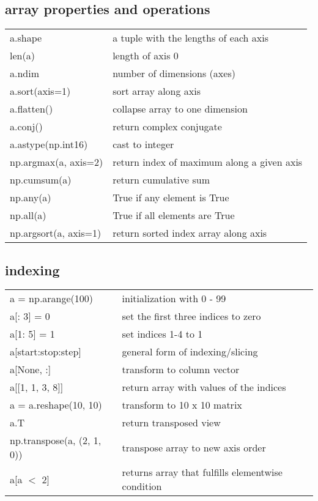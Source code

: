 \documentclass[10pt, a4paper, twocolumn]{article}
\begin{document}
\subsection*{array properties and operations}
\begin{tabular}{ p{} p{} }
  a.shape & a tuple with the lengths of each axis\\
  len(a) & length of axis 0\\
  a.ndim & number of dimensions (axes)\\
  a.sort(axis=1) & sort array along axis\\
  a.flatten() & collapse array to one dimension\\
  a.conj() & return complex conjugate\\
  a.astype(np.int16) & cast to integer\\
  np.argmax(a, axis=2) & return index of maximum along a given axis\\
  np.cumsum(a) & return cumulative sum\\
  np.any(a) & True if any element is True\\
  np.all(a) & True if all elements are True\\
  np.argsort(a, axis=1) & return sorted index array along axis\\
\end{tabular}

\subsection*{indexing}
\begin{tabular}{ p{} p{} }
  a = np.arange(100) & initialization with 0 - 99\\
  a[: 3] = 0 & set the first three indices to zero\\
  a[1: 5] = 1 & set indices 1-4 to 1\\
  a[start:stop:step] & general form of indexing/slicing\\
  a[None, :] & transform to column vector\\
  a[[1, 1, 3, 8]] & return array with values of the indices\\
  a = a.reshape(10, 10) & transform to 10 x 10 matrix\\
  a.T & return transposed view\\
  np.transpose(a, (2, 1, 0)) & transpose array to new axis order\\
  a[a $<$ 2] & returns array that fulfills elementwise condition\\
\end{tabular}
\end{document}
